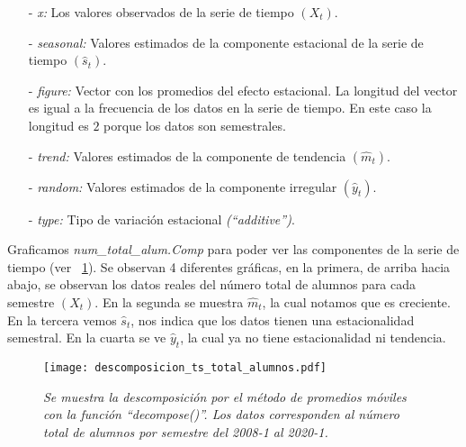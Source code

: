 \begin{itemize}
\item[-] \textit{x:} Los valores observados de la serie de tiempo $(X_{t})$.

\item[-] \textit{seasonal:} Valores estimados de la componente estacional de la serie de tiempo $(\hat{s}_{t})$.

\item[-] \textit{figure:} Vector con los promedios del efecto estacional. La longitud del vector es igual a la frecuencia de los datos en la serie de tiempo. En este caso la longitud es $2$ porque los datos son semestrales.

\item[-] \textit{trend:} Valores estimados de la componente de tendencia $(\hat{m}_{t})$.

\item[-] \textit{random:} Valores estimados de la componente irregular $(\hat{y}_{t})$.

\item[-] \textit{type:} Tipo de variación estacional \textit{(``additive'')}.
\end{itemize}


Graficamos \textit{num\_total\_alum.Comp} para poder ver las componentes de la serie de tiempo (ver \figurename{~\ref{img_en_ing_2}}). Se observan 4 diferentes gráficas, en la primera, de arriba hacia abajo, se observan los datos reales del número total de alumnos para cada semestre $(X_{t})$. En la segunda se muestra $\hat{m}_{t}$, la cual notamos que es creciente. En la tercera vemos $\hat{s}_{t}$, nos indica que los datos tienen una estacionalidad semestral. En la cuarta se ve $\hat{y}_{t}$, la cual ya no tiene estacionalidad ni tendencia.

\begin{figure}[H]
\centering
\texttt{[image: descomposicion\_ts\_total\_alumnos.pdf]} %
\caption[\textit{Descomposición por el método de promedios móviles}]{\textit{Se muestra la descomposición por el método de promedios móviles con la función ``decompose()''. Los datos corresponden al número total de alumnos por semestre del 2008-1 al 2020-1.}}\label{img_en_ing_2}
\end{figure}

